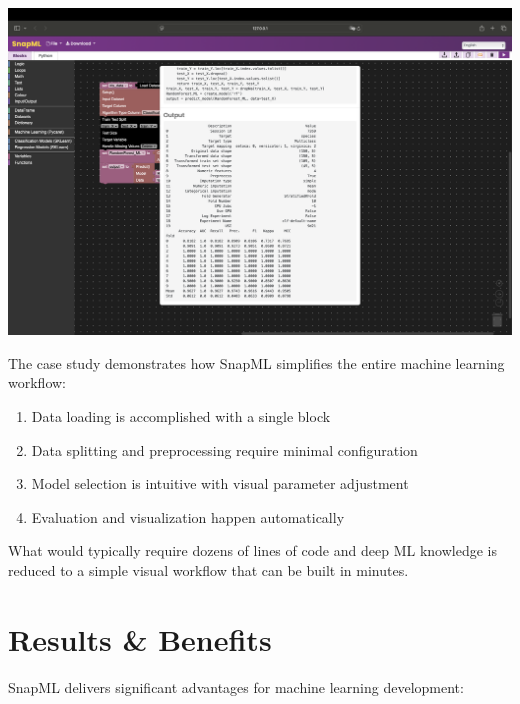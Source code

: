 \documentclass[a0paper,portrait]{article}
\newcommand{\compresslist}{%
\setlength{\itemsep}{0pt}%
\setlength{\parskip}{0pt}%
\setlength{\parsep}{0pt}%
}
\begin{document}
\begin{multicols}{2}
\begin{center}
\includegraphics[width=0.9\linewidth]{范例程序运行结果.png}
\end{center}

The case study demonstrates how SnapML simplifies the entire machine learning workflow:
\begin{enumerate}\compresslist
    \item Data loading is accomplished with a single block
    \item Data splitting and preprocessing require minimal configuration
    \item Model selection is intuitive with visual parameter adjustment
    \item Evaluation and visualization happen automatically
\end{enumerate}

What would typically require dozens of lines of code and deep ML knowledge is reduced to a simple visual workflow that can be built in minutes.

\section{Results \& Benefits}

SnapML delivers significant advantages for machine learning development:


\end{multicols}
\end{document}
